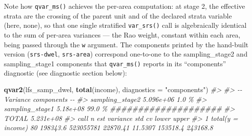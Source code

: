 \documentclass[
]{article}
\newenvironment{Shaded}{\begin{snugshade}}{\end{snugshade}}
\newcommand{\AttributeTok}[1]{\textcolor[rgb]{0.13,0.29,0.53}{#1}}
\newcommand{\CommentTok}[1]{\textcolor[rgb]{0.56,0.35,0.01}{\textit{#1}}}
\newcommand{\FunctionTok}[1]{\textcolor[rgb]{0.13,0.29,0.53}{\textbf{#1}}}
\newcommand{\NormalTok}[1]{#1}
\newcommand{\OtherTok}[1]{\textcolor[rgb]{0.56,0.35,0.01}{#1}}
\newcommand{\SpecialCharTok}[1]{\textcolor[rgb]{0.81,0.36,0.00}{\textbf{#1}}}
\newcommand{\StringTok}[1]{\textcolor[rgb]{0.31,0.60,0.02}{#1}}
\newcounter{none} %
\begin{document}
\begin{Shaded}
\end{Shaded}

Note how \texttt{qvar\_ms()} achieves the per-area computation: at stage
2, the effective strata are the crossing of the parent unit and of the
declared strata variable (here, none), so that one single stratified
\texttt{var\_srs()} call is algebraically identical to the sum of
per-area variances --- the Rao weight, constant within each area, being
passed through the \texttt{w} argument. The components printed by the
hand-built version (\texttt{srs-dwel}, \texttt{srs-area}) correspond
one-to-one to the sampling\_stage2 and sampling\_stage1 components that
\texttt{qvar\_ms()} reports in its ``components'' diagnostic (see
diagnostic section below):

\begin{Shaded}
\begin{Highlighting}[]
\FunctionTok{qvar2}\NormalTok{(lfs\_samp\_dwel, }\FunctionTok{total}\NormalTok{(income), }\AttributeTok{diagnostics =} \StringTok{"components"}\NormalTok{)}
\CommentTok{\#\textgreater{} }
\CommentTok{\#\textgreater{} {-}{-} Variance components {-}{-}}
\CommentTok{\#\textgreater{}   sampling\_stage2     5.096e+06    1.0 \%  }
\CommentTok{\#\textgreater{}   sampling\_stage1      5.18e+08   99.0 \%  \#\#\#\#\#\#\#\#\#\#\#\#\#\#\#\#\#\#\#\#}
\CommentTok{\#\textgreater{}   TOTAL               5.231e+08}
\CommentTok{\#\textgreater{}                call  n      est  variance      std      cv    lower    upper}
\CommentTok{\#\textgreater{} 1 total(y = income) 80 198343.6 523055781 22870.41 11.5307 153518.4 243168.8}
\end{Highlighting}
\end{Shaded}
\end{document}
